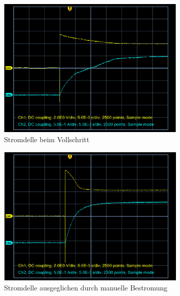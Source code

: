 \begin{figure}[htb]
	\centering
	\includegraphics[width=0.8\textwidth]{./Bilder/aufg4_Halbschritt_Stromdelle_1}
	\caption{Stromdelle beim Vollschritt}
	\label{fig:stromdelle_Halbschritt}
\end{figure}
\begin{figure}[htb]
		\centering
	\includegraphics[width=0.8\textwidth]{./Bilder/aufg4_manuell_ohne_Stromdelle_1}
	\caption{Stromdelle ausgeglichen durch manuelle Bestromung}
	\label{fig:stromdelle_manuell}
\end{figure}

\clearpage